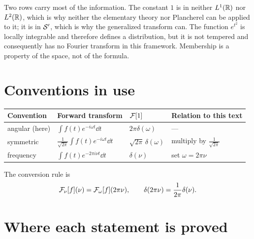 \begin{remark}
Two rows carry most of the information. The constant $1$ is in neither $L^{1}(\mathbb{R})$ nor $L^{2}(\mathbb{R})$, which is
why neither the elementary theory nor Plancherel can be applied to it; it is in $\mathcal{S}'$, which is why
the generalized transform can. The function $e^{t^{2}}$ is locally integrable and therefore defines a
distribution, but it is not tempered and consequently has no Fourier transform in this framework.
Membership is a property of the space, not of the formula.
\end{remark}

\section{Conventions in use}

\begin{center}
\small
\begin{tabular}{@{}llll@{}}
\toprule
Convention & Forward transform & $\mathcal{F}[1]$ & Relation to this text \\
\midrule
angular (here) & $\displaystyle\int f(t)e^{-i\omega t}\dd t$ & $2\pi\delta(\omega)$ & --- \\
symmetric & $\displaystyle\frac{1}{\sqrt{2\pi}}\int f(t)e^{-i\omega t}\dd t$ &
$\sqrt{2\pi}\,\delta(\omega)$ & multiply by $\frac{1}{\sqrt{2\pi}}$ \\
frequency & $\displaystyle\int f(t)e^{-2\pi i\nu t}\dd t$ & $\delta(\nu)$ & set $\omega=2\pi\nu$ \\
\bottomrule
\end{tabular}
\end{center}

The conversion rule is
\begin{equation}
\mathcal{F}_{\nu}[f](\nu)=\mathcal{F}_{\omega}[f](2\pi\nu),
\qquad
\delta(2\pi\nu)=\frac{1}{2\pi}\delta(\nu).
\end{equation}

\clearpage
\section{Where each statement is proved}

